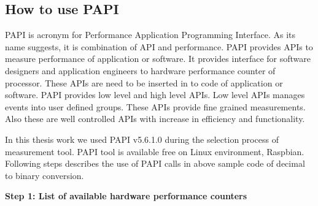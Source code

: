 \subsection{How to use PAPI}
PAPI is acronym for Performance Application Programming Interface. As its name suggests, it is combination of API and performance. PAPI provides APIs to measure performance of application or software. It provides interface for software designers and application engineers to hardware performance counter of processor. These APIs are need to be inserted in to code of application or software. PAPI provides  low level and high level APIs. Low level APIs manages events into user defined groups. These APIs provide fine grained measurements. Also these are well controlled APIs with increase in efficiency and functionality. 

\par In this thesis work we used PAPI v5.6.1.0 during the selection process of measurement tool. PAPI tool is available free on Linux environment, Raspbian. Following steps describes the use of PAPI calls in above sample code of decimal to binary conversion. 

  \textbf{Step 1: List of available hardware performance counters}
  
